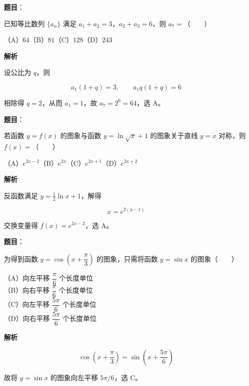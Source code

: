 \begin{answer}

\textbf{题目}：

已知等比数列 $\{a_n\}$ 满足 $a_1+a_2=3$，$a_2+a_3=6$，则 $a_7=$\mbox{（　　）}

（A）$64$\quad（B）$81$\quad（C）$128$\quad（D）$243$

\textbf{解析}

设公比为 $q$，则

\nopagebreak[4]
\[
a_1(1+q)=3,\qquad a_1q(1+q)=6
\]

相除得 $q=2$，从而 $a_1=1$，故 $a_7=2^6=64$，选 A。


\end{answer}
\begin{answer}

\textbf{题目}：

若函数 $y=f(x)$ 的图象与函数 $y=\ln\sqrt{x}+1$ 的图象关于直线 $y=x$ 对称，则 $f(x)=$\mbox{（　　）}

（A）$e^{2x-2}$\quad（B）$e^{2x}$\quad（C）$e^{2x+1}$\quad（D）$e^{2x+2}$

\textbf{解析}

反函数满足 $y=\frac12\ln x+1$，解得

\nopagebreak[4]
\[
x=e^{2(y-1)}
\]

交换变量得 $f(x)=e^{2x-2}$，选 A。


\end{answer}
\begin{answer}

\textbf{题目}：

为得到函数 $y=\cos\left(x+\dfrac\pi3\right)$ 的图象，只需将函数 $y=\sin x$ 的图象\mbox{（　　）}

（A）向左平移 $\dfrac\pi6$ 个长度单位\\
（B）向右平移 $\dfrac\pi6$ 个长度单位\\
（C）向左平移 $\dfrac{5\pi}6$ 个长度单位\\
（D）向右平移 $\dfrac{5\pi}6$ 个长度单位

\textbf{解析}

\nopagebreak[4]
\[
\cos\left(x+\frac\pi3\right)=\sin\left(x+\frac{5\pi}6\right)
\]

故将 $y=\sin x$ 的图象向左平移 $5\pi/6$，选 C。


\end{answer}
